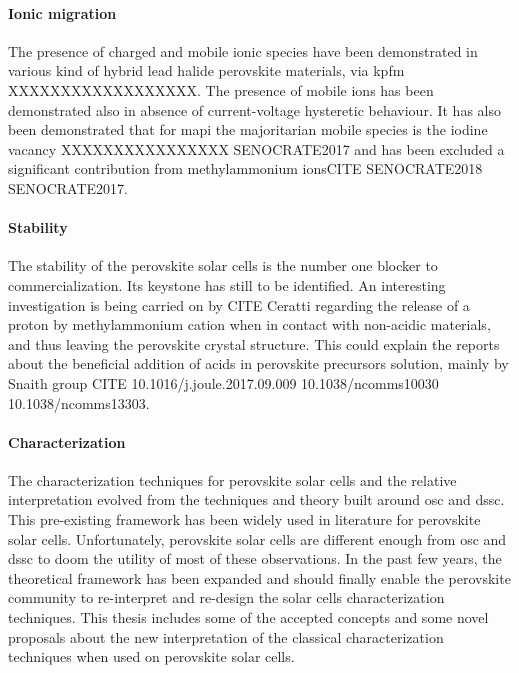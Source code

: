 	\paragraph{Ionic migration}
	
		The presence of charged and mobile ionic species have been demonstrated in various kind of hybrid lead halide perovskite materials, via \gls{kpfm}\cite{Birkhold2018} XXXXXXXXXXXXXXXXXX. The presence of mobile ions has been demonstrated also in absence of current-voltage hysteretic behaviour\cite{Calado2016,Jacobs2018}. It has also been demonstrated that for \gls{mapi} the majoritarian mobile species is the iodine vacancy XXXXXXXXXXXXXXXX SENOCRATE2017 and has been excluded a significant contribution from methylammonium ionsCITE SENOCRATE2018 SENOCRATE2017.

\paragraph{Stability}
	The stability of the perovskite solar cells is the number one blocker to commercialization. Its keystone has still to be identified. An interesting investigation is being carried on by CITE Ceratti regarding the release of a proton by methylammonium cation when in contact with non-acidic materials, and thus leaving the perovskite crystal structure. This could explain the reports about the beneficial addition of acids in perovskite precursors solution, mainly by Snaith group CITE 10.1016/j.joule.2017.09.009 10.1038/ncomms10030 10.1038/ncomms13303.

	\paragraph{Characterization}
	
	The characterization techniques for perovskite solar cells and the relative interpretation evolved from the techniques and theory built around \gls{osc} and \gls{dssc}. This pre-existing framework has been widely used in literature for perovskite solar cells. Unfortunately, perovskite solar cells are different enough from \gls{osc} and \gls{dssc} to doom the utility of most of these observations. In the past few years, the theoretical framework has been expanded and should finally enable the perovskite community to re-interpret and re-design the solar cells characterization techniques. This thesis includes some of the accepted concepts and some novel proposals about the new interpretation of the classical characterization techniques when used on perovskite solar cells. 

